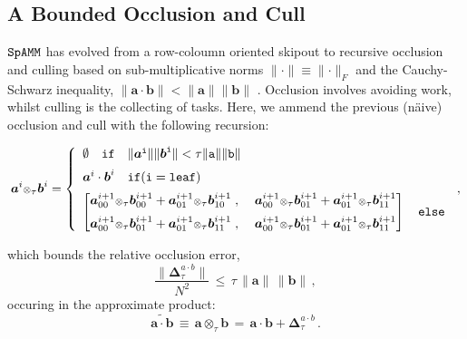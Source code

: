 \documentclass[letterpaper,twocolumn,amsmath,amsfont,amssymb,english,aps,jcp,preprintnumbers,groupaddress,nofootinbib,tightenlines,floatfix]{revtex4}
\newcommand{\mat}[1]{\boldsymbol{#1}}
\newcommand{\ot}{  {\scriptstyle \otimes}_{ \tau } }
\theoremstyle{plain}
\theoremstyle{remark}
\theoremstyle{plain}
\begin{document}
\subsection{A Bounded Occlusion and Cull }

$\tt SpAMM$ has evolved from a row-coloumn oriented skipout \cite{} to recursive occlusion and culling \cite{}
based on sub-multiplicative norms $\lVert \cdot \rVert \equiv \lVert \cdot \rVert_F$ and the 
Cauchy-Schwarz inequality,  $\lVert \mat{a}\cdot \mat{b} \rVert < \lVert \mat{a} \rVert \lVert \mat{b} \rVert$ \cite{kahan}.
Occlusion involves avoiding work, whilst culling is the collecting of tasks. 
Here, we ammend the previous (n\"{a}ive) occlusion and cull with the following recursion:
\begin{widetext}
\begin{equation}
\mat{a}^{i} \ot \mat{b}^{i} =
\left\{
        \begin{array}{ll}
                 \emptyset \quad \tt{if}\quad \lVert \mat{a}^i \rVert \lVert \mat{b}^i \rVert < \tau \lVert a \rVert \lVert b \rVert \\[0.2cm]
                 \mat{a} ^i \cdot \mat{b}^i \quad  \tt{if}(i=\tt{leaf}) \\[0.2cm]
\begin{bmatrix} \mat{a}^{i+1}_{00} \ot \mat{b}^{i+1}_{00} +\mat{a}^{i+1}_{01} \ot \mat{b}^{i+1}_{10} \; , \; &
                \mat{a}^{i+1}_{00} \ot \mat{b}^{i+1}_{01} +\mat{a}^{i+1}_{01} \ot \mat{b}^{i+1}_{11}  \\[0.2cm]
                \mat{a}^{i+1}_{00} \ot \mat{b}^{i+1}_{01} +\mat{a}^{i+1}_{01} \ot \mat{b}^{i+1}_{11} \; , \; &
                \mat{a}^{i+1}_{00} \ot \mat{b}^{i+1}_{01} +\mat{a}^{i+1}_{01} \ot \mat{b}^{i+1}_{11}
\end{bmatrix}  \quad \tt{else}
                \end{array}
              \right.  \, ,
\end{equation}
\end{widetext}
which bounds the relative occlusion error,  
\begin{equation}\label{bound}
\frac{\lVert \mat{\Delta}^{a \cdot b}_{\tau} \rVert}{N^2 }  \, \leq \, \tau \, \lVert \mat{a} \rVert  \,  \lVert \mat{b} \rVert \, ,
\end{equation}
occuring in the approximate product:
\begin{equation}
\widetilde{\mat{a}\cdot \mat{b}} \,  \equiv \, \mat{a} \ot \mat{b} \,
  = \, \mat{a} \cdot \mat{b} + \mat{\Delta}^{a \cdot b}_{\tau} \,.
\end{equation}
\end{document}
